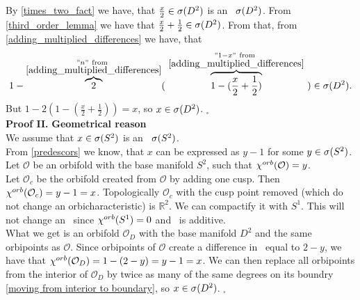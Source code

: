 By \ref{times_two_fact} we have, that 
$\frac{x}{2} \in {{\sigma}(D^2)}$ is an \apots\ ${{\sigma}(D^2)}$. From \ref{third_order_lemma} we have that 
$\frac{x}{2} + \frac{1}{2} \in {{\sigma}(D^2)}$. From that, from \ref{adding_multiplied_differences} 
we have, 
that \begin{equation}
1-\overbrace{2}^{\substack{"n"\rm\ from\ \\ 
\rm \ref{adding_multiplied_differences}}} 
(\ \overbrace{1-(\frac{x}{2}+\frac{1}{2})}^{\substack{"1-x"\rm\ 
from\ \\ \rm \ref{adding_multiplied_differences}}}\ ) \in \speD.
\end{equation} 
But $1 - 2(1-(\frac{x}{2}+
\frac{1}{2})) = x$, so $x \in {{\sigma}(D^2)}$. $_\square$
\\[2pt]
\textbf{Proof II.}
\textbf{Geometrical reason} \\
We assume that $x \in {{\sigma}(S^2)}$ is an \apots\ ${{\sigma}(S^2)}$.\\
From \ref{predescors} we know, that $x$ can be expressed as $y - 1$ for some $y \in {{\sigma}(S^2)}$. \\
Let $\mathcal{O}$ be an orbifold with the base manifold $S^2$, such that ${\chi^{orb}(\mathcal{O})} 
= y$. \\
Let $\mathcal{O}_c$ be the orbifold created from $\mathcal{O}$ by adding one cusp. 
Then ${\chi^{orb}(\mathcal{O}_c)} = y - 1 = x$. Topologically $\mathcal{O}_c$ with the cusp point 
removed (which do not change an orbicharacteristic) is $\mathbb{R}^2$. 
We can compactify it with $S^1$. This will not change an \Eoc\ since ${\chi^{orb}(S^1)} = 0$ and 
\Eoc\ is additive.
\\ What we get is an orbifold $\mathcal{O}_D$ with the base 
manifold $D^2$ and the same 
orbipoints as $\mathcal{O}$. Since orbipoints of $\mathcal{O}$ create a difference 
in \Eoc\ equal to $2-y$, we have that ${\chi^{orb}(\mathcal{O}_D)} = 1 - (2-y) = y - 1 = x$. 
We can then replace all orbipoints from the interior of $\mathcal{O}_D$ by twice as many 
of the same degrees on its boundry \ref{moving from interior to boundary}, 
so $x \in {{\sigma}(D^2)}$. $_\square$\\









